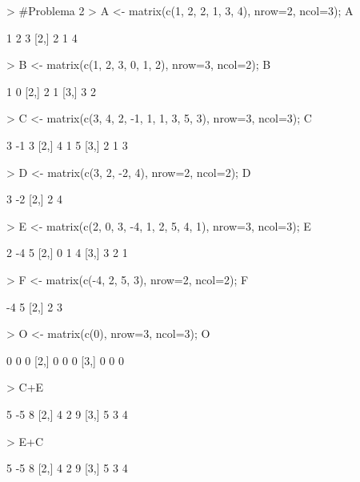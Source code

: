 \documentclass{article}
\begin{document}
\begin{Schunk}
\begin{Sinput}
> #Problema 2
> A <- matrix(c(1, 2, 2, 1, 3, 4), nrow=2, ncol=3); A
\end{Sinput}
\begin{Soutput}
     [,1] [,2] [,3]
[1,]    1    2    3
[2,]    2    1    4
\end{Soutput}
\begin{Sinput}
> B <- matrix(c(1, 2, 3, 0, 1, 2), nrow=3, ncol=2); B
\end{Sinput}
\begin{Soutput}
     [,1] [,2]
[1,]    1    0
[2,]    2    1
[3,]    3    2
\end{Soutput}
\begin{Sinput}
> C <- matrix(c(3, 4, 2, -1, 1, 1, 3, 5, 3), nrow=3, ncol=3); C
\end{Sinput}
\begin{Soutput}
     [,1] [,2] [,3]
[1,]    3   -1    3
[2,]    4    1    5
[3,]    2    1    3
\end{Soutput}
\begin{Sinput}
> D <- matrix(c(3, 2, -2, 4), nrow=2, ncol=2); D
\end{Sinput}
\begin{Soutput}
     [,1] [,2]
[1,]    3   -2
[2,]    2    4
\end{Soutput}
\begin{Sinput}
> E <- matrix(c(2, 0, 3, -4, 1, 2, 5, 4, 1), nrow=3, ncol=3); E
\end{Sinput}
\begin{Soutput}
     [,1] [,2] [,3]
[1,]    2   -4    5
[2,]    0    1    4
[3,]    3    2    1
\end{Soutput}
\begin{Sinput}
> F <- matrix(c(-4, 2, 5, 3), nrow=2, ncol=2); F
\end{Sinput}
\begin{Soutput}
     [,1] [,2]
[1,]   -4    5
[2,]    2    3
\end{Soutput}
\begin{Sinput}
> O <- matrix(c(0), nrow=3, ncol=3); O
\end{Sinput}
\begin{Soutput}
     [,1] [,2] [,3]
[1,]    0    0    0
[2,]    0    0    0
[3,]    0    0    0
\end{Soutput}
\end{Schunk}

\begin{Schunk}
\begin{Sinput}
> C+E
\end{Sinput}
\begin{Soutput}
     [,1] [,2] [,3]
[1,]    5   -5    8
[2,]    4    2    9
[3,]    5    3    4
\end{Soutput}
\end{Schunk}
\begin{Schunk}
\begin{Sinput}
> E+C
\end{Sinput}
\begin{Soutput}
     [,1] [,2] [,3]
[1,]    5   -5    8
[2,]    4    2    9
[3,]    5    3    4
\end{Soutput}
\end{Schunk}
\end{document}
